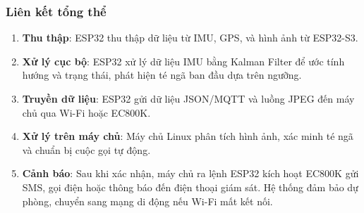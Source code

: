 \subsubsection{Liên kết tổng thể}
\begin{enumerate}
    \item \textbf{Thu thập}: ESP32 thu thập dữ liệu từ IMU, GPS, và hình ảnh từ ESP32-S3.
    \item \textbf{Xử lý cục bộ}: ESP32 xử lý dữ liệu IMU bằng Kalman Filter để ước tính hướng và trạng thái, phát hiện té ngã ban đầu dựa trên ngưỡng.
    \item \textbf{Truyền dữ liệu}: ESP32 gửi dữ liệu JSON/MQTT và luồng JPEG đến máy chủ qua Wi-Fi hoặc EC800K.
    \item \textbf{Xử lý trên máy chủ}: Máy chủ Linux phân tích hình ảnh, xác minh té ngã và chuẩn bị cuộc gọi tự động.
    \item \textbf{Cảnh báo}: Sau khi xác nhận, máy chủ ra lệnh ESP32 kích hoạt EC800K gửi SMS, gọi điện hoặc thông báo đến điện thoại giám sát. Hệ thống đảm bảo dự phòng, chuyển sang mạng di động nếu Wi-Fi mất kết nối.
\end{enumerate}

